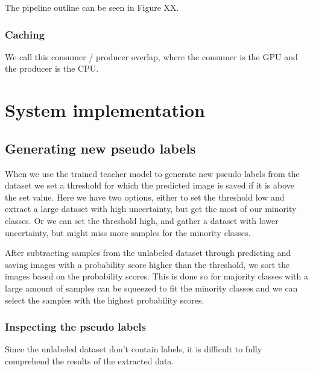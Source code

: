 \documentclass[thesis.tex]{subfiles}
\begin{document}
The pipeline outline can be seen in Figure XX.

\subsubsection{Caching}
We call this consumer / producer overlap, where the consumer is the GPU and the producer is the CPU. %




\section{System implementation} \label{sec:system_implementation}


\subsection{Generating new pseudo labels}
When we use the trained teacher model to generate new pseudo labels from the dataset we set a threshold for which the predicted image is saved if it is above the set value. Here we have two options, either to set the threshold low and extract a large dataset with high uncertainty, but get the most of our minority classes. Or we can set the threshold high, and gather a dataset with lower uncertainty, but might miss more samples for the minority classes.

After subtracting samples from the unlabeled dataset through predicting and saving images with a probability score higher than the threshold, we sort the images based on the probability scores. This is done so for majority classes with a large amount of samples can be squeezed to fit the minority classes and we can select the samples with the highest probability scores.

\subsubsection{Inspecting the pseudo labels}
Since the unlabeled dataset don't contain labels, it is difficult to fully comprehend the results of the extracted data.
\end{document}
